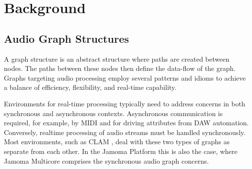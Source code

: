 \documentclass[twoside,a4paper]{article}
\begin{document}

%
%  
%





\section{Background} %



\subsection{Audio Graph Structures} %

A graph structure is an abstract structure where paths are created between nodes. %
The paths between these nodes then define the data-flow of the graph.  
Graphs targeting audio processing employ several patterns and idioms to achieve a balance of efficiency, flexibility, and real-time capability.

Environments for real-time processing typically need to address concerns in both synchronous and asynchronous contexts.  
Asynchronous communication is required, for example, by MIDI and for driving attributes from DAW automation.  
Conversely, realtime processing of audio streams must be handled synchronously.  
Most environments, such as CLAM  \cite{Amatraian:2007}, deal with these two types of graphs as separate from each other.  
In the Jamoma Platform this is also the case, where Jamoma Multicore comprises the synchronous audio graph concerns.
\end{document}
